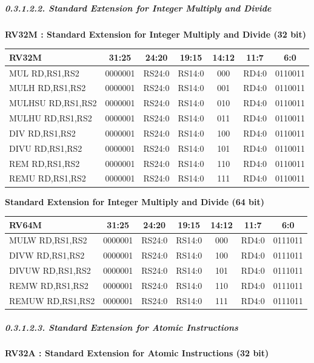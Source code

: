 \documentclass[
]{article}
\begin{document}
\hypertarget{standard-extension-for-integer-multiply-and-divide}{%
\subparagraph{0.3.1.2.2. Standard Extension for Integer Multiply and
Divide}\label{standard-extension-for-integer-multiply-and-divide}}

\textbf{RV32M : Standard Extension for Integer Multiply and Divide (32
bit)}

\begin{longtable}[]{@{}lcccccc@{}}
\toprule
RV32M & 31:25 & 24:20 & 19:15 & 14:12 & 11:7 & 6:0\tabularnewline
\midrule
\endhead
MUL RD,RS1,RS2 & 0000001 & RS24:0 & RS14:0 & 000 & RD4:0 &
0110011\tabularnewline
MULH RD,RS1,RS2 & 0000001 & RS24:0 & RS14:0 & 001 & RD4:0 &
0110011\tabularnewline
MULHSU RD,RS1,RS2 & 0000001 & RS24:0 & RS14:0 & 010 & RD4:0 &
0110011\tabularnewline
MULHU RD,RS1,RS2 & 0000001 & RS24:0 & RS14:0 & 011 & RD4:0 &
0110011\tabularnewline
DIV RD,RS1,RS2 & 0000001 & RS24:0 & RS14:0 & 100 & RD4:0 &
0110011\tabularnewline
DIVU RD,RS1,RS2 & 0000001 & RS24:0 & RS14:0 & 101 & RD4:0 &
0110011\tabularnewline
REM RD,RS1,RS2 & 0000001 & RS24:0 & RS14:0 & 110 & RD4:0 &
0110011\tabularnewline
REMU RD,RS1,RS2 & 0000001 & RS24:0 & RS14:0 & 111 & RD4:0 &
0110011\tabularnewline
\bottomrule
\end{longtable}

\textbf{Standard Extension for Integer Multiply and Divide (64 bit)}

\begin{longtable}[]{@{}lcccccc@{}}
\toprule
RV64M & 31:25 & 24:20 & 19:15 & 14:12 & 11:7 & 6:0\tabularnewline
\midrule
\endhead
MULW RD,RS1,RS2 & 0000001 & RS24:0 & RS14:0 & 000 & RD4:0 &
0111011\tabularnewline
DIVW RD,RS1,RS2 & 0000001 & RS24:0 & RS14:0 & 100 & RD4:0 &
0111011\tabularnewline
DIVUW RD,RS1,RS2 & 0000001 & RS24:0 & RS14:0 & 101 & RD4:0 &
0111011\tabularnewline
REMW RD,RS1,RS2 & 0000001 & RS24:0 & RS14:0 & 110 & RD4:0 &
0111011\tabularnewline
REMUW RD,RS1,RS2 & 0000001 & RS24:0 & RS14:0 & 111 & RD4:0 &
0111011\tabularnewline
\bottomrule
\end{longtable}

\hypertarget{standard-extension-for-atomic-instructions}{%
\subparagraph{0.3.1.2.3. Standard Extension for Atomic
Instructions}\label{standard-extension-for-atomic-instructions}}

\textbf{RV32A : Standard Extension for Atomic Instructions (32 bit)}
\end{document}
